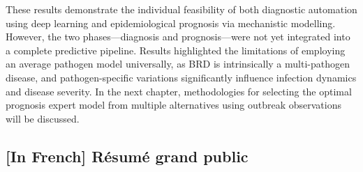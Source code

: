 These results demonstrate the individual feasibility of both diagnostic automation using deep learning and epidemiological prognosis via mechanistic modelling. However, the two phases—diagnosis and prognosis—were not yet integrated into a complete predictive pipeline. Results highlighted the limitations of employing an average pathogen model universally, as BRD is intrinsically a multi-pathogen disease, and pathogen-specific variations significantly influence infection dynamics and disease severity. In the next chapter, methodologies for selecting the optimal prognosis expert model from multiple alternatives using outbreak observations will be discussed. 










\subsection{[In French] Résumé grand public}


